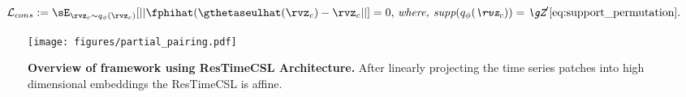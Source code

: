 \documentclass{article} %
\theoremstyle{plain}
\theoremstyle{definition}
\theoremstyle{remark}
\numberwithin{equation}{section}
\begin{document}
\begin{equation}\label{eq:compositional_consistency}
    \mathcal{L}_{cons} := \sE_{\rvz_{c} \sim q_{\phi}(\rvz_c)}[||\fphihat(\gthetaseulhat(\rvz_{c}) - \rvz_{c}||]=0,\, \textit{where, $ \textit{supp}(q_{\phi}(\rvz_c))=\gZ'$} \cref{eq:support_permutation}.
\end{equation}




\begin{figure}
    \centering
    \vspace{-0.8cm}
    \texttt{[image: figures/partial\_pairing.pdf]}
    \caption{\textbf{Overview of \TimeCSL framework using ResTimeCSL Architecture.} After linearly projecting the time series patches into high dimensional embeddings the ResTimeCSL is affine. \label{fig:model}}
    \vspace{-0.4cm}
\end{figure}
\end{document}
